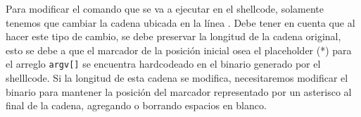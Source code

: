 Para modificar el comando que se va a ejecutar en el shellcode, solamente tenemos que cambiar la cadena ubicada en la línea .
Debe tener en cuenta que al hacer este tipo de cambio, se debe preservar la longitud de la cadena original, esto se debe a que el marcador de la posición inicial osea el placeholder (*) para el arreglo \texttt{argv[]} se encuentra hardcodeado en el binario generado por el shelllcode. Si la longitud de esta cadena se modifica, necesitaremos modificar el binario para mantener la posición del marcador representado por un asterisco al final de la cadena, agregando o borrando espacios en blanco.

